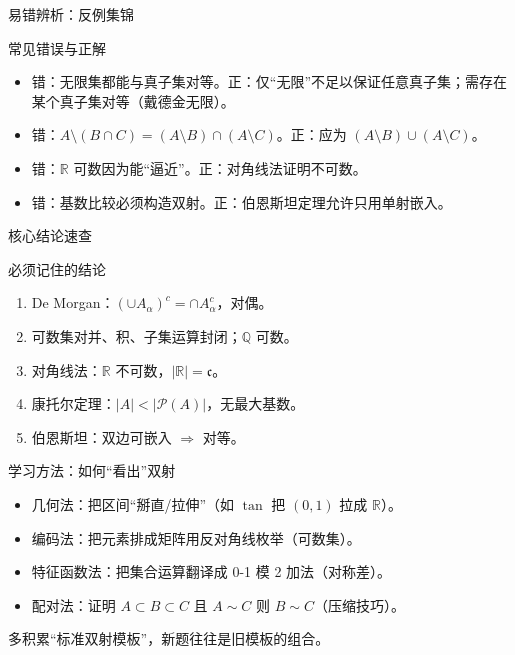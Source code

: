 \documentclass[aspectratio=169,11pt]{ctexbeamer}
\begin{document}
\begin{frame}{易错辨析：反例集锦}
  \begin{block}{常见错误与正解}
    \begin{itemize}
      \item 错：无限集都能与真子集对等。\quad 正：仅“无限”不足以保证任意真子集；需存在某个真子集对等（戴德金无限）。
      \item 错：$A\setminus(B\cap C)=(A\setminus B)\cap(A\setminus C)$。\quad 正：应为 $(A\setminus B)\cup(A\setminus C)$。
      \item 错：$\mathbb{R}$ 可数因为能“逼近”。\quad 正：对角线法证明不可数。
      \item 错：基数比较必须构造双射。\quad 正：伯恩斯坦定理允许只用单射嵌入。
    \end{itemize}
  \end{block}
\end{frame}

\begin{frame}{核心结论速查}
  \begin{block}{必须记住的结论}
    \begin{enumerate}
      \item De Morgan：$({\cup}A_\alpha)^c={\cap}A_\alpha^c$，对偶。
      \item 可数集对并、积、子集运算封闭；$\mathbb{Q}$ 可数。
      \item 对角线法：$\mathbb{R}$ 不可数，$|\mathbb{R}|=\mathfrak{c}$。
      \item 康托尔定理：$|A|<|\mathcal{P}(A)|$，无最大基数。
      \item 伯恩斯坦：双边可嵌入 $\Rightarrow$ 对等。
    \end{enumerate}
  \end{block}
\end{frame}

\begin{frame}{学习方法：如何“看出”双射}
  \begin{itemize}
    \item \alert{几何法}：把区间“掰直/拉伸”（如 $\tan$ 把 $(0,1)$ 拉成 $\mathbb{R}$）。
    \item \alert{编码法}：把元素排成矩阵用反对角线枚举（可数集）。
    \item \alert{特征函数法}：把集合运算翻译成 0-1 模 2 加法（对称差）。
    \item \alert{配对法}：证明 $A\subset B\subset C$ 且 $A\sim C$ 则 $B\sim C$（压缩技巧）。
  \end{itemize}
  \begin{center}
    \color{clouddeep}\small 多积累“标准双射模板”，新题往往是旧模板的组合。
  \end{center}
\end{frame}
\end{document}
